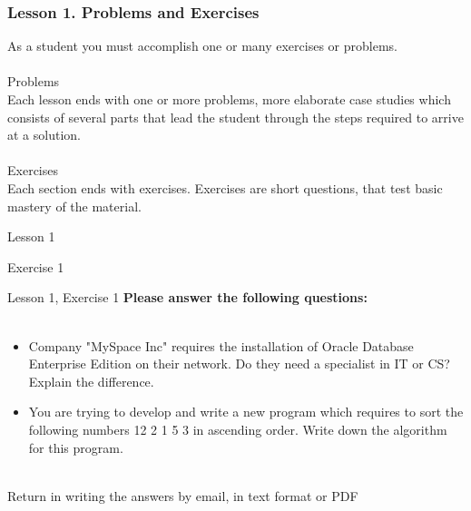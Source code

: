 \documentclass[aspectratio=1610]{beamer}
\begin{document}

\begin{frame}
\frametitle{Lesson 1. Problems and Exercises}
\LARGE
As a student you must accomplish one or many exercises or problems.\\~\\
\Large \alert{Problems}\\
Each lesson ends with one or more problems, more elaborate case studies which consists of several parts that lead the student through the steps required to arrive at a solution.
\\~\\ 
\Large \alert{Exercises} \\
Each section ends with exercises. Exercises are short questions, that test basic mastery of the material.
\end{frame}

\begin{frame}{Lesson 1}{}
\begin{center}
\Huge Exercise 1
\end{center}
\end{frame}

\begin{frame}{Lesson 1, Exercise 1}{}
\Large
\textbf{Please answer the following questions:}\\~\\ 

\Large{
\begin{itemize}
    \item Company "MySpace Inc" requires the installation of Oracle Database Enterprise Edition on their network. Do they need a specialist in IT or CS? Explain the difference.
    \item You are trying to develop and write a new program which requires to sort the following numbers 12 2 1 5 3 in ascending order. Write down the algorithm for this program. \\~\\
\end{itemize}}

Return in writing the answers by email, in text format or PDF
\end{frame}
\end{document}
